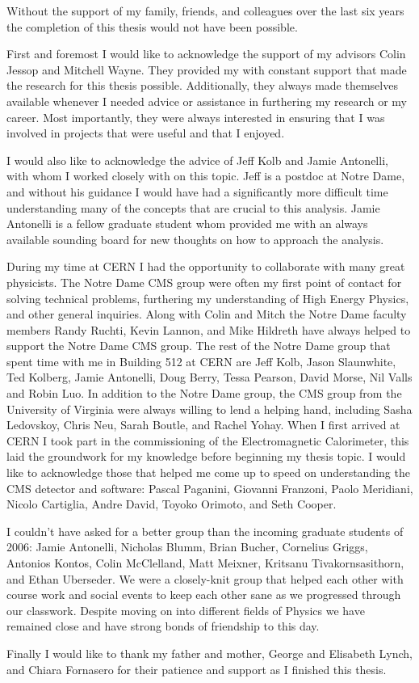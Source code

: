 \documentclass[textrefs,final,noinfo]{nddiss2e}
\begin{document}
\begin{acknowledge}
Without the support of my family, friends, and colleagues over the last six years the completion of this thesis would not have been possible.

First and foremost I would like to acknowledge the support of my advisors Colin Jessop and Mitchell Wayne. 
They provided my with constant support that made the research for this thesis possible.
Additionally, they always made themselves available whenever I needed advice or assistance in furthering my research or my career.
Most importantly, they were always interested in ensuring that I was involved in projects that were useful and that I enjoyed.

I would also like to acknowledge the advice of Jeff Kolb and Jamie Antonelli, with whom I worked closely with on this topic.
Jeff is a postdoc at Notre Dame, and without his guidance I would have had a significantly more difficult time understanding many of the concepts that are crucial to this analysis.
Jamie Antonelli is a fellow graduate student whom provided me with an always available sounding board for new thoughts on how to approach the analysis.

During my time at CERN I had the opportunity to collaborate with many great physicists.
The Notre Dame CMS group were often my first point of contact for solving technical problems, furthering my understanding of High Energy Physics, and other general inquiries.
Along with Colin and Mitch the Notre Dame faculty members Randy Ruchti, Kevin Lannon, and Mike Hildreth have always helped to support the Notre Dame CMS group.
The rest of the Notre Dame group that spent time with me in Building 512 at CERN are Jeff Kolb, Jason Slaunwhite, Ted Kolberg, Jamie Antonelli, Doug Berry, Tessa Pearson, David Morse, Nil Valls and Robin Luo.
In addition to the Notre Dame group, the CMS group from the University of Virginia were always willing to lend a helping hand, including Sasha Ledovskoy, Chris Neu, Sarah Boutle, and Rachel Yohay.
When I first arrived at CERN I took part in the commissioning of the Electromagnetic Calorimeter, this laid the groundwork for my knowledge before beginning my thesis topic.
I would like to acknowledge those that helped me come up to speed on understanding the CMS detector and software: Pascal Paganini, Giovanni Franzoni, Paolo Meridiani, Nicolo Cartiglia, Andre David, Toyoko Orimoto, and Seth Cooper.

I couldn't have asked for a better group than the incoming graduate students of 2006: Jamie Antonelli, Nicholas Blumm, Brian Bucher, Cornelius Griggs, Antonios Kontos, Colin McClelland, Matt Meixner, Kritsanu Tivakornsasithorn, and Ethan Uberseder.
We were a closely-knit group that helped each other with course work and social events to keep each other sane as we progressed through our classwork.
Despite moving on into different fields of Physics we have remained close and have strong bonds of friendship to this day.

Finally I would like to thank my father and mother, George and Elisabeth Lynch, and Chiara Fornasero for their patience and support as I finished this thesis.

\end{acknowledge}
\end{document}
